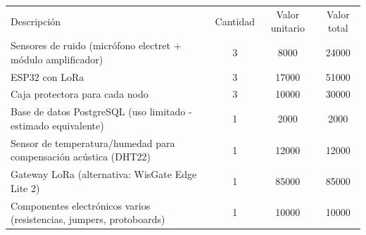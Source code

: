 \documentclass[
11pt, %
]{charter}
\begin{document}
\begin{table}[htpb]
\centering
\begin{tabularx}{\linewidth}{@{}|X|c|r|r|@{}}
\hline
\rowcolor[HTML]{C0C0C0} 
\multicolumn{4}{|c|}{\cellcolor[HTML]{C0C0C0}COSTOS DIRECTOS} \\ \hline
\rowcolor[HTML]{C0C0C0} 
Descripción &
  \multicolumn{1}{c|}{\cellcolor[HTML]{C0C0C0}Cantidad} &
  \multicolumn{1}{c|}{\cellcolor[HTML]{C0C0C0}Valor unitario} &
  \multicolumn{1}{c|}{\cellcolor[HTML]{C0C0C0}Valor total} \\ \hline
  Sensores de ruido (micrófono electret + módulo amplificador)&
  \multicolumn{1}{c|}{3} &
  \multicolumn{1}{c|}{8000} &
  \multicolumn{1}{c|}{24000} \\ \hline
 ESP32 con LoRa&
  \multicolumn{1}{c|}{3} &
  \multicolumn{1}{c|}{17000} &
  \multicolumn{1}{c|}{51000} \\ \hline
  Caja protectora para cada nodo&
  \multicolumn{1}{c|}{3} &
  \multicolumn{1}{c|}{10000} &
  \multicolumn{1}{c|}{30000} \\ \hline
  Base de datos PostgreSQL (uso limitado - estimado equivalente)&
  \multicolumn{1}{c|}{1} &
  \multicolumn{1}{c|}{2000} &
  \multicolumn{1}{c|}{2000} \\ \hline
  Sensor de temperatura/humedad para compensación acústica (DHT22)&
  \multicolumn{1}{c|}{1} &
  \multicolumn{1}{c|}{12000} &
  \multicolumn{1}{c|}{12000} \\ \hline
  Gateway LoRa (alternativa: WisGate Edge Lite 2)&
  \multicolumn{1}{c|}{1} &
  \multicolumn{1}{c|}{85000} &
  \multicolumn{1}{c|}{85000} \\ \hline
  Componentes electrónicos varios (resistencias, jumpers, protoboards)&
  \multicolumn{1}{c|}{1} &
  \multicolumn{1}{c|}{10000} &
  \multicolumn{1}{c|}{10000} \\ \hline


\end{tabularx}
\end{table}
\end{document}
